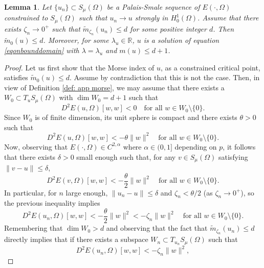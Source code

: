 \documentclass[10pt,a4paper]{article}
\newtheorem{lemma}[theorem]{Lemma}
\theoremstyle{definition} \theoremstyle{remark}
\numberwithin{equation}{section}
\newcommand{\R}{\mathbb{R}}
\newcommand{\la}{\lambda}
\begin{document}
\begin{lemma} \label{lemmorse}
	Let $\{u_n\} \subset S_\mu(\Omega)$ be a Palais-Smale sequence of $E(\cdot,\Omega)$ constrained to $S_\mu(\Omega)$ such that $u_n \to u$ strongly in $H_0^1(\Omega)$. Assume that there exists $\zeta_n \to 0^+$ such that $\tilde m_{\zeta_n}(u_n) \le d$ for some positive integer $d$. Then $\tilde m_0(u) \leq d$. Moreover, for some $\la_u \in \R$, $u$ is a solution of equation \eqref{eqonbounddomain} with $\la = \la_u$ and $m(u) \leq d+1$.
\end{lemma}

\begin{proof}
	Let us first show that the Morse index of $u$, as a constrained critical point, satisfies $\tilde m_0(u) \leq d$.  Assume by contradiction that this is not the case. Then, in view of Definition \ref{def: app morse}, we may assume that there exists a $W_0 \subset T_uS_\mu(\Omega)$ with $\dim W_0 = d+1$ such that
	\begin{equation*}
		D^2 E(u,\Omega)[w,w]<0
		\quad \text{for all } w \in W_0 \setminus \{0\}.
	\end{equation*}
	Since $W_0$ is of finite dimension, its unit sphere is
	compact and there exists $\theta > 0$ such that
	\begin{equation*}
		D^2 E(u,\Omega)[w,w] < -\theta \|w\|^2
		\quad \text{for all } w \in W_0 \setminus\{0\}.
	\end{equation*}
	Now, observing that $E(\cdot,\Omega) \in C^{2,\alpha}$ where $\alpha \in (0,1]$ depending on $p$, it follows that there exists $\delta>0$ small enough such that, for any $v \in S_\mu(\Omega)$ satisfying $\|v-u\| \leq \delta$,
	\begin{equation*}
		D^2 E(v,\Omega)[w,w] < -\frac{\theta}{2} \|w\|^2
		\quad \text{for all } w \in W_0 \setminus \{0\}.
	\end{equation*}
	In particular, for $n$ large enough, $\|u_n - u\| \le
	\delta$ and $\zeta_n < \theta/2$ (as $\zeta_n \to 0^+$),
	so the previous inequality implies
	\begin{equation*}
		D^2 E(u_n,\Omega)[w,w] < -\frac{\theta}{2}\|w\|^2 < -\zeta_n\|w\|^2
		\quad \text{for all } w \in W_0 \setminus \{0\} .
	\end{equation*}
	Remembering that $\dim W_0>d$ and observing that the fact that $\tilde m_{\zeta_n}(u_n) \leq d$ directly implies that if there
	exists a subspace $W_n \subset T_{u_n}S_\mu(\Omega)$ such that
	\begin{equation*}
		D^2 E(u_n,\Omega)[w,w]  < - \zeta_n \|w\|^2,

\end{equation*}
\end{proof}
\end{document}
